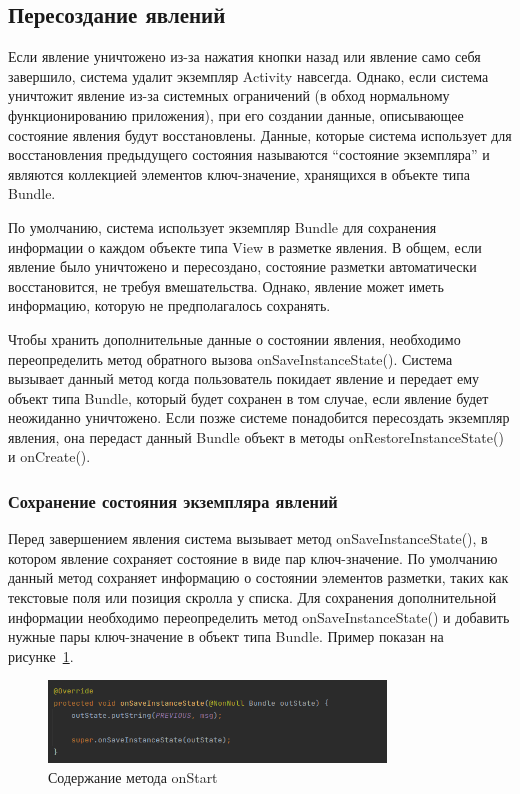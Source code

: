 \subsection{Пересоздание явлений}
Если явление уничтожено из-за нажатия кнопки назад или явление само себя
завершило, система удалит экземпляр Activity навсегда. Однако, если
система уничтожит явление из-за системных ограничений (в обход
нормальному функционированию приложения), при его создании данные,
описывающее состояние явления будут восстановлены. Данные, которые
система использует для восстановления предыдущего состояния называются
“состояние экземпляра” и являются коллекцией элементов ключ-значение,
хранящихся в объекте типа Bundle.\par
По умолчанию, система использует экземпляр Bundle для сохранения
информации о каждом объекте типа View в разметке явления. В общем, если
явление было уничтожено и пересоздано, состояние разметки
автоматически восстановится, не требуя вмешательства. Однако,
явление может иметь информацию, которую не предполагалось сохранять.\par
Чтобы хранить дополнительные данные о состоянии явления, необходимо
переопределить метод обратного вызова onSaveInstanceState(). Система
вызывает данный метод когда пользователь покидает явление и передает ему
объект типа Bundle, который будет сохранен в том случае, если явление
будет неожиданно уничтожено. Если позже системе понадобится пересоздать
экземпляр явления, она передаст данный Bundle объект в методы
onRestoreInstanceState() и onCreate().

\subsubsection{Сохранение состояния экземпляра явлений}
Перед завершением явления система вызывает метод onSaveInstanceState(), в
котором явление сохраняет состояние в виде пар ключ-значение. По
умолчанию данный метод сохраняет информацию о состоянии элементов
разметки, таких как текстовые поля или позиция скролла у списка.
Для сохранения дополнительной информации необходимо переопределить
метод onSaveInstanceState() и добавить нужные пары ключ-значение в объект
типа Bundle. Пример показан на рисунке~\ref{fig:activity:onSaveInstanceState}.
\begin{figure}[h!tp]
	\centering
	\includegraphics[width=0.8\textwidth]{Screenshot from 2023-02-24 19-35-25.png}
	\caption{Содержание метода onStart}
	\label{fig:activity:onSaveInstanceState}
\end{figure}

